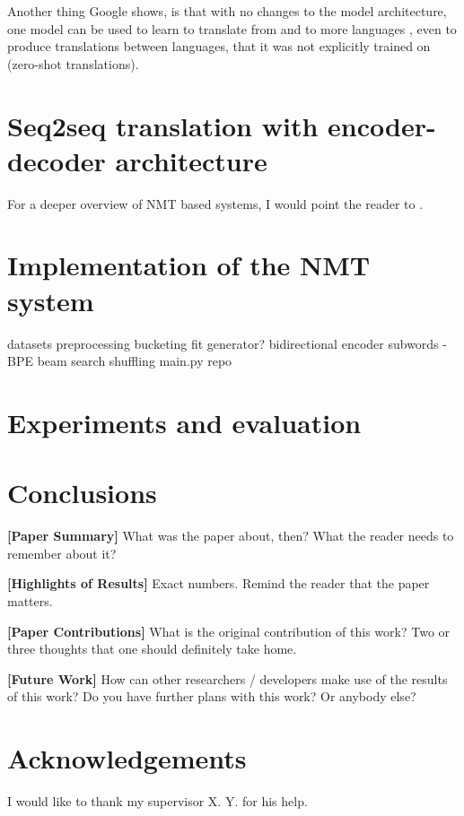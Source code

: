 \documentclass{ExcelAtFIT}
\begin{document}
Another thing Google shows, is that with no changes to the model architecture, one model can be used to learn to translate from and to more languages \cite{googleMultiLingual}, even to produce translations between languages, that it was not explicitly trained on (zero-shot translations).

\section{Seq2seq translation with encoder-decoder architecture}


For a deeper overview of NMT based systems, I would point the reader to \cite{nmtTutorial}.

\section{Implementation of the NMT system}

datasets
preprocessing
bucketing
fit generator?
bidirectional encoder
subwords - BPE
beam search
shuffling
main.py repo


\section{Experiments and evaluation}

\section{Conclusions}
\label{sec:Conclusions}

\textbf{[Paper Summary]} What was the paper about, then? What the reader needs to remember about it?

\textbf{[Highlights of Results]} Exact numbers. Remind the reader that the paper matters.


\textbf{[Paper Contributions]} What is the original contribution of this work? Two or three thoughts that one should definitely take home.


\textbf{[Future Work]} How can other researchers / developers make use of the results of this work?  Do you have further plans with this work? Or anybody else?


\section*{Acknowledgements}
I would like to thank my supervisor X. Y. for his help.





\end{document}
